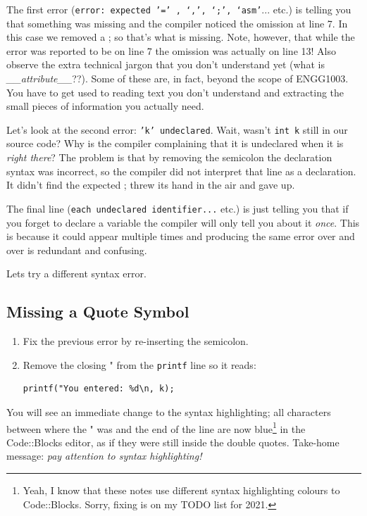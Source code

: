 \documentclass{lab}
\begin{document}
The first error (\texttt{error: expected '=' , ‘,’, ‘;’, ‘asm'}... etc.) is telling you that something was missing and the compiler noticed the omission at line 7. In this case we removed a ; so that's what is missing. Note, however, that while the error was reported to be on line 7 the omission was actually on line 13! Also observe the extra technical jargon that you don't understand yet (what is \textit{\_\_attribute\_\_}??). Some of these are, in fact, beyond the scope of ENGG1003. You have to get used to reading text you don't understand and extracting the small pieces of information you actually need.

Let's look at the second error: \texttt{'k' undeclared}. Wait, wasn't \texttt{int k} still in our source code? Why is the compiler complaining that it is undeclared when it is \textit{right there}? The problem is that by removing the semicolon the declaration syntax was incorrect, so the compiler did not interpret that line as a declaration. It didn't find the expected ; threw its hand in the air and gave up.

The final line (\texttt{each undeclared identifier...} etc.) is just telling you that if you forget to declare a variable the compiler will only tell you about it \textit{once}. This is because it could appear multiple times and producing the same error over and over is redundant and confusing.

Lets try a different syntax error.

\subsection{Missing a Quote Symbol}

\begin{task}{}{}
\begin{enumerate}
\item Fix the previous error by re-inserting the semicolon.
\item Remove the closing " from the \texttt{printf} line so it reads:
\begin{lstlisting}[style=CStyle]
printf("You entered: %d\n, k);
\end{lstlisting}
\end{enumerate}
\end{task}

You will see an immediate change to the syntax highlighting; all characters between where the " was and the end of the line are now blue\footnote{Yeah, I know that these notes use different syntax highlighting colours to Code::Blocks. Sorry, fixing is on my TODO list for 2021.} in the Code::Blocks editor, as if they were still inside the double quotes. Take-home message: \textit{pay attention to syntax highlighting!}
\end{document}
